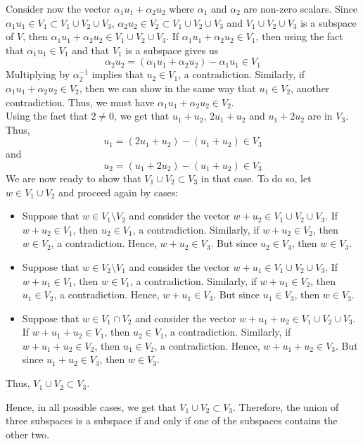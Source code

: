 \begin{solution}
\begin{itemize}
        Consider now the vector $\alpha_1 u_1 + \alpha_2 u_2$ where $\alpha_1$ and $\alpha_2$ are non-zero scalars. Since $\alpha_1 u_1 \in V_1 \subset V_1 \cup V_2 \cup V_3$, $\alpha_2 u_2 \in V_2 \subset V_1 \cup V_2 \cup V_3$ and $V_1 \cup V_2 \cup V_3$ is a subspace of $V$, then $\alpha_1 u_1 + \alpha_2 u_2 \in V_1 \cup V_2 \cup V_3$. If $\alpha_1 u_1 + \alpha_2 u_2 \in V_1$, then using the fact that $\alpha_1 u_1 \in V_1$ and that $V_1$ is a subspace gives us
        $$\alpha_2 u_2 = (\alpha_1 u_1 + \alpha_2 u_2) - \alpha_1 u_1 \in V_1$$
        Multiplying by $\alpha_2^{-1}$ implies that $u_2 \in V_1$, a contradiction. Similarly, if $\alpha_1u_1 + \alpha_2 u_2 \in V_2$, then we can show in the same way that $u_1 \in V_2$, another contradiction. Thus, we must have $\alpha_1u_1 + \alpha_2 u_2 \in V_2$. \\
        Using the fact that $2 \neq 0$, we get that $u_1 + u_2$, $2u_1 + u_2$ and $u_1 + 2u_2$ are in $V_3$. Thus,
        $$u_1 = (2u_1 + u_2) - (u_1 + u_2) \in V_3$$
        and 
        $$u_2 = (u_1 + 2u_2) - (u_1 + u_2) \in V_3$$
        We are now ready to show that $V_1 \cup V_2 \subset V_3$ in that case. To do so, let $w \in V_1 \cup V_2$ and proceed again by cases:
        \begin{itemize}
            \item Suppose that $w \in V_1 \setminus V_2$ and consider the vector $w + u_2 \in V_1 \cup V_2 \cup V_3$. If $w + u_2 \in V_1$, then $u_2 \in V_1$, a contradiction. Similarly, if $w + u_2 \in V_2$, then $w \in V_2$, a contradiction. Hence, $w + u_2 \in V_3$. But since $u_2 \in V_3$, then $w \in V_3$.
            \item Suppose that $w \in V_2 \setminus V_1$ and consider the vector $w + u_1 \in V_1 \cup V_2 \cup V_3$. If $w + u_1 \in V_1$, then $w \in V_1$, a contradiction. Similarly, if $w + u_1 \in V_2$, then $u_1 \in V_2$, a contradiction. Hence, $w + u_1 \in V_3$. But since $u_1 \in V_3$, then $w \in V_3$.
            \item Suppose that $w \in V_1 \cap V_2$ and consider the vector $w + u_1 + u_2 \in V_1 \cup V_2 \cup V_3$. If $w + u_1 + u_2 \in V_1$, then $u_2 \in V_1$, a contradiction. Similarly, if $w + u_1 + u_2 \in V_2$, then $u_1 \in V_2$, a contradiction. Hence, $w + u_1 + u_2 \in V_3$. But since $u_1 + u_2 \in V_3$, then $w \in V_3$.
        \end{itemize}
        Thus, $V_1 \cup V_2 \subset V_3$.
    \end{itemize}
    Hence, in all possible cases, we get that $V_1 \cup V_2 \subset V_3$. Therefore, the union of three subspaces is a subspace if and only if one of the subspaces contains the other two.\\
\end{solution}

